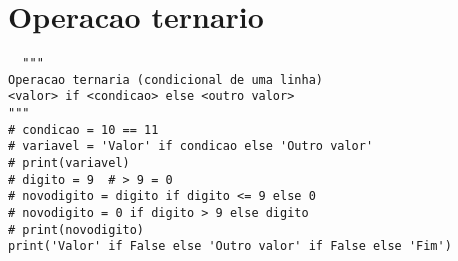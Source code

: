 \documentclass{article}
\begin{document}
\section{Operacao ternario}
\begin{lstlisting}
  """
Operacao ternaria (condicional de uma linha)
<valor> if <condicao> else <outro valor>
"""
# condicao = 10 == 11
# variavel = 'Valor' if condicao else 'Outro valor'
# print(variavel)
# digito = 9  # > 9 = 0
# novodigito = digito if digito <= 9 else 0
# novodigito = 0 if digito > 9 else digito
# print(novodigito)
print('Valor' if False else 'Outro valor' if False else 'Fim')
\end{lstlisting}
\end{document}
